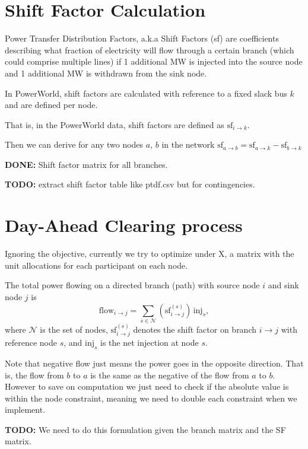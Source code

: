 \documentclass[11pt]{article}
\begin{document}
\section{Shift Factor Calculation}
Power Transfer Distribution Factors, a.k.a Shift Factors (sf) are coefficients describing what fraction of electricity will flow through a certain branch (which could comprise multiple lines) if 1 additional MW is injected into the source node and 1 additional MW is withdrawn from the sink node.

In PowerWorld, shift factors are calculated with reference to a fixed slack bus $k$ and are defined per node. 

That is, in the PowerWorld data, shift factors are defined as $\text{sf}_{i \rightarrow k}$. 

Then we can derive for any two nodes $a$, $b$ in the network $\text{sf}_{a \rightarrow b} = \text{sf}_{a \rightarrow k} - \text{sf}_{b \rightarrow k}$

\textbf{DONE:} Shift factor matrix for all branches.

\textbf{TODO:} extract shift factor table like ptdf.csv but for contingencies.

\newpage
\section{Day-Ahead Clearing process}

Ignoring the objective, currently we try to optimize under X, a matrix with the unit allocations for each participant on each node.

The total power flowing on a directed branch (path) with source node $i$ and sink node $j$ is
\[
  \mathrm{flow}_{i\rightarrow j}
  = \sum_{s\in\mathcal{N}} \left(\mathrm{sf}^{(s)}_{i\rightarrow j}\right)\,\mathrm{inj}_s,
\]
where $\mathcal{N}$ is the set of nodes, $\mathrm{sf}^{(s)}_{i\rightarrow j}$ denotes the shift factor on branch $i\to j$ with reference node $s$, and $\mathrm{inj}_s$ is the net injection at node $s$.

Note that negative flow just means the power goes in the opposite direction. That is, the flow from $b$ to $a$ is the same as the negative of the flow from $a$ to $b$. However to save on computation we just need to check if the absolute value is within the node constraint, meaning we need to double each constraint when we implement.

\textbf{TODO:} We need to do this formulation given the branch matrix and the SF matrix.
\end{document}
